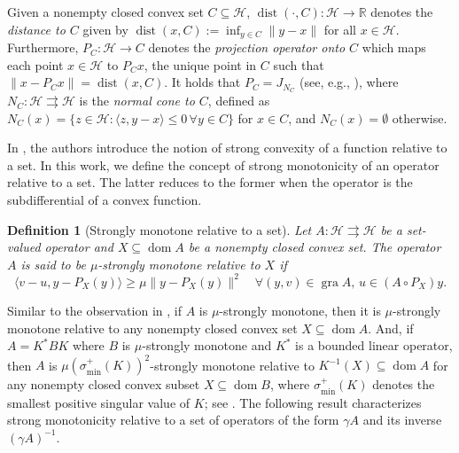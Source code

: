 \documentclass[a4paper,12pt]{article}
\newtheorem{definition}[theorem]{Definition}
\DeclareMathOperator{\dom}{dom}
\DeclareMathOperator{\dist}{dist}
\newcommand{\setto}{\rightrightarrows}
\begin{document}
Given a nonempty closed convex set $C \subseteq \mathcal{H}$, $\dist(\cdot,C)\colon\mathcal{H}\to\mathbb{R}$ denotes the \emph{distance to $C$} given by $\dist(x,C) := \inf_{y \in C} \|y-x\|$ for all $x \in \mathcal{H}$. Furthermore, $P_C\colon\mathcal{H}\to C$ denotes the \emph{projection operator onto $C$} which maps each point $x\in\mathcal{H}$ to $P_Cx$, the unique point in $C$ such that $\|x - P_Cx\| = \dist(x,C)$. It holds that $P_C = J_{N_C}$ (see, e.g., \cite[Example~23.4]{bauschke2017convex}), where $N_C : \mathcal{H}\setto\mathcal{H}$ is the \emph{normal cone to $C$}, defined as $N_C(x) = \{ z \in \mathcal{H}: \langle z , y -x  \rangle \leq 0 \,\forall y \in C \}$ for $x \in C$, and $N_C(x) = \emptyset$ otherwise.



In \cite[Section~3.1]{pena2021linear}, the authors introduce the notion of strong convexity of a function relative to a set. %
In this work, we define the concept of strong monotonicity of an operator relative to a set. The latter reduces to the former when the operator is the subdifferential of a convex function.
\begin{definition}[Strongly monotone relative to a set] \label{d:relative-to-a-set}
    Let $A:\mathcal{H}\setto\mathcal{H}$ be a set-valued 
    operator and $X\subseteq\dom A$ be a nonempty closed convex set. The operator $A$ is said to be \emph{$\mu$-strongly monotone relative to $X$} if
    \begin{equation*}\label{eq:relative strong monotonicity}
\langle v - u, y - P_X(y) \rangle \ge \mu \|y - P_X(y)\|^2\quad \forall (y, v) \in \operatorname{gra} A,\, u \in (A\circ P_X)y.
\end{equation*} 
\end{definition}
Similar to the observation in \cite[p.~10]{pena2021linear}, if $A$ is $\mu$-strongly monotone, then it is $\mu$-strongly monotone relative to any nonempty closed convex set $X\subseteq\dom A$. And, if $A=K^*BK$ where $B$ is $\mu$-strongly monotone and $K^*$ is a bounded linear operator, then $A$ is $\mu(\sigma^+_{\min}(K))^2$-strongly monotone relative to $K^{-1}(X)\subseteq\dom A$ for any nonempty closed convex subset $X\subseteq\dom B$, where $\sigma_{\min}^+(K)$ denotes the smallest positive singular value of $K$; see \cite[Lemma~4]{pena2021linear}. The following result characterizes strong monotonicity relative to a set of operators of the form $\gamma A$ and its inverse $(\gamma A)^{-1}$.
\end{document}
